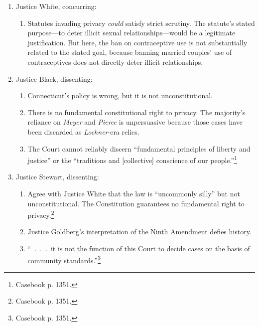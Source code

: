 \begin{enumerate}
\begin{enumerate}
        the specific guarantees elsewhere provided by the 
        Constitution.~.~.~.~It is a rational continuum which, broadly 
        speaking, includes a freedom from all substantial arbitrary 
        impositions and purposeless restraints.''\footnote{Casebook p. 1347.}
        \item Statutes regulating fundamental rights, such as privacy, are 
        subject to strict scrutiny.\footnote{Casebook p. 1347.} Connecticut 
        failed to show a compelling government interest because it has failed 
        to enforce the statute against individual users.\footnote{Casebook p. 
        1148.}
    \end{enumerate}
    \item Justice White, concurring:
    \begin{enumerate}
        \item Statutes invading privacy \emph{could} satisfy strict scrutiny. 
        The statute's stated purpose---to deter illicit sexual 
        relationships---would be a legitimate justification. But here, the ban 
        on contraceptive use is not substantially related to the stated goal, 
        because banning married couples' use of contraceptives does not 
        directly deter illicit relationships.
    \end{enumerate}
    \item Justice Black, dissenting:
    \begin{enumerate}
        \item Connecticut's policy is wrong, but it is not unconstitutional.
        \item There is no fundamental constitutional right to privacy. The 
        majority's reliance on \emph{Meyer} and \emph{Pierce} is unpersuasive 
        because those cases have been discarded as \emph{Lochner}-era relics.
        \item The Court cannot reliably discern ``fundamental principles of 
        liberty and justice'' or the ``traditions and [collective] conscience 
        of our people.''\footnote{Casebook p. 1351.}
    \end{enumerate}
    \item Justice Stewart, dissenting:
    \begin{enumerate}
        \item Agree with Justice White that the law is ``uncommonly silly'' 
        but not unconstitutional. The Constitution guarantees no fundamental 
        right to privacy.\footnote{Casebook p. 1351.}
        \item Justice Goldberg's interpretation of the Ninth Amendment defies 
        history.
        \item ``~.~.~.~it is not the function of this Court to decide cases on 
        the basis of community standards.''\footnote{Casebook p. 1351.}
    \end{enumerate}
\end{enumerate}

